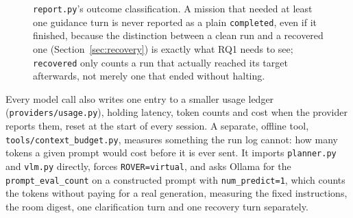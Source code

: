 \begin{figure}[htbp]
  \centering
  \caption{\texttt{report.py}'s outcome classification. A mission that needed at least one guidance turn is never reported as a plain \texttt{completed}, even if it finished, because the distinction between a clean run and a recovered one (Section~\ref{sec:recovery}) is exactly what RQ1 needs to see; \texttt{recovered} only counts a run that actually reached its target afterwards, not merely one that ended without halting.}
  \label{fig:flow-outcome}
\end{figure}

Every model call also writes one entry to a smaller usage ledger
(\texttt{providers/usage.py}), holding latency, token counts and cost when
the provider reports them, reset at the start of every session. A separate,
offline tool, \texttt{tools/context\_budget.py}, measures something the run
log cannot: how many tokens a given prompt would cost before it is ever
sent. It imports \texttt{planner.py} and \texttt{vlm.py} directly, forces
\texttt{ROVER=virtual}, and asks Ollama for the \texttt{prompt\_eval\_count}
on a constructed prompt with \texttt{num\_predict=1}, which counts the
tokens without paying for a real generation, measuring the fixed
instructions, the room digest, one clarification turn and one recovery turn
separately.
